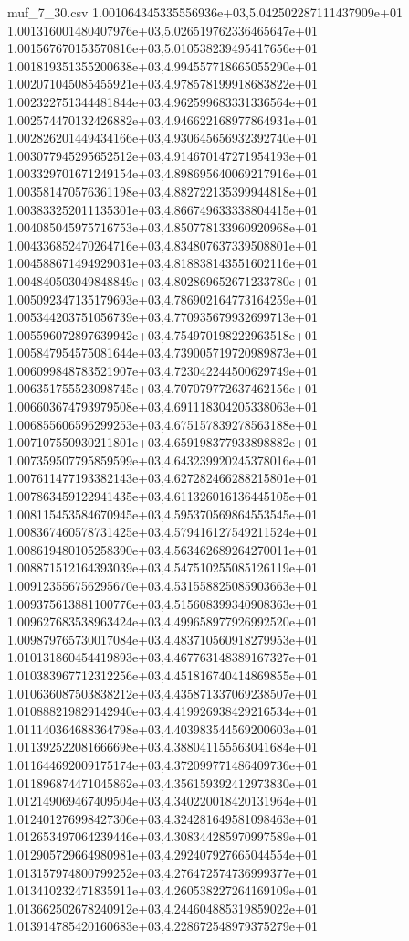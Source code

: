 \begin{filecontents*}{muf_7_30.csv}
1.001064345335556936e+03,5.042502287111437909e+01
1.001316001480407976e+03,5.026519762336465647e+01
1.001567670153570816e+03,5.010538239495417656e+01
1.001819351355200638e+03,4.994557718665055290e+01
1.002071045085455921e+03,4.978578199918683822e+01
1.002322751344481844e+03,4.962599683331336564e+01
1.002574470132426882e+03,4.946622168977864931e+01
1.002826201449434166e+03,4.930645656932392740e+01
1.003077945295652512e+03,4.914670147271954193e+01
1.003329701671249154e+03,4.898695640069217916e+01
1.003581470576361198e+03,4.882722135399944818e+01
1.003833252011135301e+03,4.866749633338804415e+01
1.004085045975716753e+03,4.850778133960920968e+01
1.004336852470264716e+03,4.834807637339508801e+01
1.004588671494929031e+03,4.818838143551602116e+01
1.004840503049848849e+03,4.802869652671233780e+01
1.005092347135179693e+03,4.786902164773164259e+01
1.005344203751056739e+03,4.770935679932699713e+01
1.005596072897639942e+03,4.754970198222963518e+01
1.005847954575081644e+03,4.739005719720989873e+01
1.006099848783521907e+03,4.723042244500629749e+01
1.006351755523098745e+03,4.707079772637462156e+01
1.006603674793979508e+03,4.691118304205338063e+01
1.006855606596299253e+03,4.675157839278563188e+01
1.007107550930211801e+03,4.659198377933898882e+01
1.007359507795859599e+03,4.643239920245378016e+01
1.007611477193382143e+03,4.627282466288215801e+01
1.007863459122941435e+03,4.611326016136445105e+01
1.008115453584670945e+03,4.595370569864553545e+01
1.008367460578731425e+03,4.579416127549211524e+01
1.008619480105258390e+03,4.563462689264270011e+01
1.008871512164393039e+03,4.547510255085126119e+01
1.009123556756295670e+03,4.531558825085903663e+01
1.009375613881100776e+03,4.515608399340908363e+01
1.009627683538963424e+03,4.499658977926992520e+01
1.009879765730017084e+03,4.483710560918279953e+01
1.010131860454419893e+03,4.467763148389167327e+01
1.010383967712312256e+03,4.451816740414869855e+01
1.010636087503838212e+03,4.435871337069238507e+01
1.010888219829142940e+03,4.419926938429216534e+01
1.011140364688364798e+03,4.403983544569200603e+01
1.011392522081666698e+03,4.388041155563041684e+01
1.011644692009175174e+03,4.372099771486409736e+01
1.011896874471045862e+03,4.356159392412973830e+01
1.012149069467409504e+03,4.340220018420131964e+01
1.012401276998427306e+03,4.324281649581098463e+01
1.012653497064239446e+03,4.308344285970997589e+01
1.012905729664980981e+03,4.292407927665044554e+01
1.013157974800799252e+03,4.276472574736999377e+01
1.013410232471835911e+03,4.260538227264169109e+01
1.013662502678240912e+03,4.244604885319859022e+01
1.013914785420160683e+03,4.228672548979375279e+01

\end{filecontents*}
